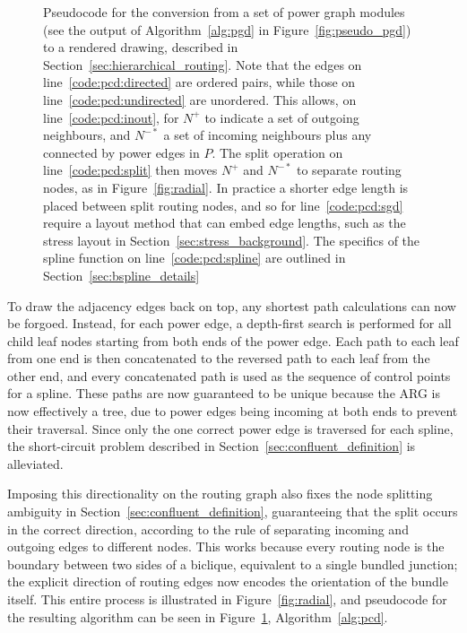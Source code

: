 \begin{figure}
  \caption[Pseudocode for power-confluent drawing]{Pseudocode for the conversion from a set of power graph modules (see the output of Algorithm~\ref{alg:pgd} in Figure~\ref{fig:pseudo_pgd}) to a rendered drawing, described in Section~\ref{sec:hierarchical_routing}. 
  Note that the edges on line~\ref{code:pcd:directed} are ordered pairs, while those on line~\ref{code:pcd:undirected} are unordered. This allows, on line~\ref{code:pcd:inout}, for $N^+$ to indicate a set of outgoing neighbours, and $N^{-*}$ a set of incoming neighbours plus any connected by power edges in $P$.
  The split operation on line~\ref{code:pcd:split} then moves $N^+$ and $N^{-*}$ to separate routing nodes, as in Figure~\ref{fig:radial}.
  In practice a shorter edge length is placed between split routing nodes, and so for line~\ref{code:pcd:sgd} require a layout method that can embed edge lengths, such as the stress layout in Section~\ref{sec:stress_background}.
  The specifics of the spline function on line~\ref{code:pcd:spline} are outlined in Section~\ref{sec:bspline_details}}
  \label{fig:pseudo_pcd}
\end{figure}

To draw the adjacency edges back on top, any shortest path calculations can now be forgoed. Instead, for each power edge, a depth-first search is performed for all child leaf nodes starting from both ends of the power edge. Each path to each leaf from one end is then concatenated to the reversed path to each leaf from the other end, and every concatenated path is used as the sequence of control points for a spline.
These paths are now guaranteed to be unique because the ARG is now effectively a tree, due to power edges being incoming at both ends to prevent their traversal. Since only the one correct power edge is traversed for each spline, the short-circuit problem described in Section~\ref{sec:confluent_definition} is alleviated.

Imposing this directionality on the routing graph also fixes the node splitting ambiguity in Section~\ref{sec:confluent_definition}, guaranteeing that the split occurs in the correct direction, according to the rule of separating incoming and outgoing edges to different nodes.
This works because every routing node is the boundary between two sides of a biclique, equivalent to a single bundled junction; the explicit direction of routing edges now encodes the orientation of the bundle itself.
This entire process is illustrated in Figure~\ref{fig:radial}, and pseudocode for the resulting algorithm can be seen in Figure~\ref{fig:pseudo_pcd}, Algorithm~\ref{alg:pcd}.

